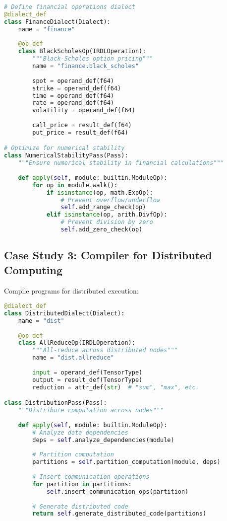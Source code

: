 \documentclass[11pt,a4paper]{article}
\begin{document}
\begin{lstlisting}[language=Python, caption=Financial DSL Compiler]
# Define financial operations dialect
@dialect_def
class FinanceDialect(Dialect):
    name = "finance"
    
    @op_def
    class BlackScholesOp(IRDLOperation):
        """Black-Scholes option pricing"""
        name = "finance.black_scholes"
        
        spot = operand_def(f64)
        strike = operand_def(f64)
        time = operand_def(f64)
        rate = operand_def(f64)
        volatility = operand_def(f64)
        
        call_price = result_def(f64)
        put_price = result_def(f64)

# Optimize for numerical stability
class NumericalStabilityPass(Pass):
    """Ensure numerical stability in financial calculations"""
    
    def apply(self, module: builtin.ModuleOp):
        for op in module.walk():
            if isinstance(op, math.ExpOp):
                # Prevent overflow/underflow
                self.add_range_check(op)
            elif isinstance(op, arith.DivfOp):
                # Prevent division by zero
                self.add_zero_check(op)
\end{lstlisting}

\subsection{Case Study 3: Compiler for Distributed Computing}

Compile programs for distributed execution:

\begin{lstlisting}[language=Python, caption=Distributed Computing Compiler]
@dialect_def
class DistributedDialect(Dialect):
    name = "dist"
    
    @op_def
    class AllReduceOp(IRDLOperation):
        """All-reduce across distributed nodes"""
        name = "dist.allreduce"
        
        input = operand_def(TensorType)
        output = result_def(TensorType)
        reduction = attr_def(str)  # "sum", "max", etc.

class DistributionPass(Pass):
    """Distribute computation across nodes"""
    
    def apply(self, module: builtin.ModuleOp):
        # Analyze data dependencies
        deps = self.analyze_dependencies(module)
        
        # Partition computation
        partitions = self.partition_computation(module, deps)
        
        # Insert communication operations
        for partition in partitions:
            self.insert_communication_ops(partition)
        
        # Generate distributed code
        return self.generate_distributed_code(partitions)
\end{lstlisting}
\end{document}
